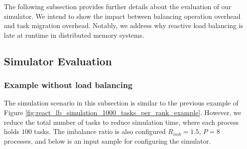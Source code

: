 The following subsection provides further details about the evaluation of our simulator. We intend to show the impact between balancing operation overhead and task migration overhead. Notably, we address why reactive load balancing is late at runtime in distributed memory systems.



\subsection{Simulator Evaluation}
\label{subsec:Simulator-Evaluation}

\subsubsection{Example without load balancing}
\label{subsubsec:eval-sim-example-no-lb}

The simulation scenario in this subsection is similar to the previous example of Figure \ref{fig:react_lb_simulation_1000_tasks_per_rank_example}. However, we reduce the total number of tasks to reduce simulation time, where each process holds $100$ tasks. The imbalance ratio is also configured $R_{imb} = 1.5$, $P = 8$ processes, and below is an input sample for configuring the simulator.


